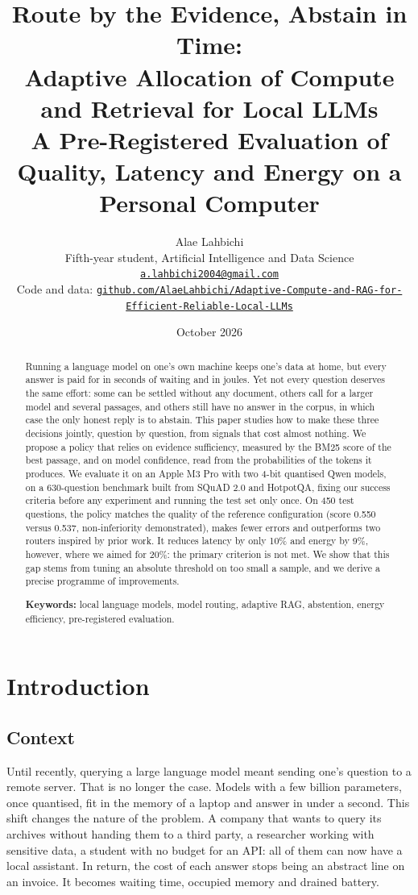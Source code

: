 \documentclass[11pt,a4paper]{article}
\title{\textbf{Route by the Evidence, Abstain in Time:\\ Adaptive Allocation of Compute and Retrieval
for Local LLMs}\\[6pt]
\large A Pre-Registered Evaluation of Quality, Latency and Energy on a Personal Computer}
\author{Alae Lahbichi\\[2pt]
\small Fifth-year student, Artificial Intelligence and Data Science\\
\small\href{mailto:a.lahbichi2004@gmail.com}{\texttt{a.lahbichi2004@gmail.com}}\\
\small Code and data: \href{https://github.com/AlaeLahbichi/Adaptive-Compute-and-RAG-for-Efficient-Reliable-Local-LLMs}{\scriptsize\texttt{github.com/AlaeLahbichi/Adaptive-Compute-and-RAG-for-Efficient-Reliable-Local-LLMs}}}
\date{October 2026}
\begin{document}
\maketitle

\begin{abstract}
\noindent Running a language model on one's own machine keeps one's data at home, but every answer is
paid for in seconds of waiting and in joules. Yet not every question deserves the same effort: some
can be settled without any document, others call for a larger model and several passages, and others
still have no answer in the corpus, in which case the only honest reply is to abstain. This paper
studies how to make these three decisions jointly, question by question, from signals that cost almost
nothing. We propose a policy that relies on evidence sufficiency, measured by the BM25 score of the
best passage, and on model confidence, read from the probabilities of the tokens it produces. We
evaluate it on an Apple M3 Pro with two 4-bit quantised Qwen models, on a 630-question benchmark built
from SQuAD 2.0 and HotpotQA, fixing our success criteria before any experiment and running the test set
only once. On 450 test questions, the policy matches the quality of the reference configuration (score
0.550 versus 0.537, non-inferiority demonstrated), makes fewer errors and outperforms two routers
inspired by prior work. It reduces latency by only 10\% and energy by 9\%, however, where we aimed for
20\%: the primary criterion is not met. We show that this gap stems from tuning an absolute threshold
on too small a sample, and we derive a precise programme of improvements.

\medskip
\noindent\textbf{Keywords:} local language models, model routing, adaptive RAG, abstention, energy
efficiency, pre-registered evaluation.
\end{abstract}

\section{Introduction}\label{sec:intro}

\subsection{Context}

Until recently, querying a large language model meant sending one's question to a remote server. That
is no longer the case. Models with a few billion parameters, once quantised, fit in the memory of a
laptop and answer in under a second. This shift changes the nature of the problem. A company that wants
to query its archives without handing them to a third party, a researcher working with sensitive data,
a student with no budget for an API: all of them can now have a local assistant. In return, the cost of
each answer stops being an abstract line on an invoice. It becomes waiting time, occupied memory and
drained battery.
\end{document}

